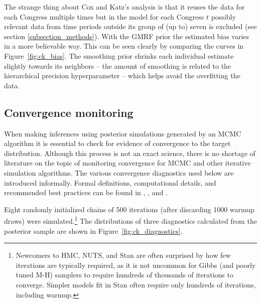 The strange thing about Cox and Katz's analysis is that it reuses the data for each Congress multiple times but in the model for each Congress $t$ possibly relevant data from time periods outside its group of (up to) seven is excluded (see section \ref{subsection_methods}). With the GMRF prior the estimated bias varies in a more believable way. This can be seen clearly by comparing the curves in Figure~\ref{fig:ck_bias}. The smoothing prior shrinks each individual estimate slightly towards its neighbors -- the amount of smoothing is related to the hierarchical precision hyperparameter -- which helps avoid the overfitting the data. 

\subsection{Convergence monitoring}
\label{subsection_convergence}



When making inferences using posterior simulations generated by an MCMC algorithm it is essential to check for evidence of convergence to the target distribution. Although this process is not an exact science, there is no shortage of literature on the topic of monitoring convergence for MCMC and other iterative simulation algorithms. The various convergence diagnostics used below are introduced informally. Formal definitions, computational details, and recommended best practices can be found in , , and .

Eight randomly initialized chains of 500 iterations (after discarding 1000 warmup draws) were simulated.\footnote{Newcomers to HMC, NUTS, and Stan are often surprised by how few iterations are typically required, as it is not uncommon for Gibbs (and poorly tuned M-H) samplers to require hundreds of thousands of iterations to converge. Simpler models fit in Stan often require only hundreds of iterations, including warmup.} The distributions of three diagnostics calculated from the posterior sample are shown in Figure~\ref{fig:ck_diagnostics}. 

